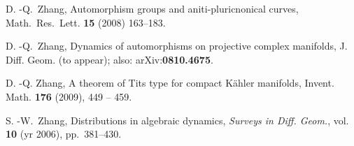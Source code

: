 \documentclass[11pt,a4paper,psamsfonts]{amsart}
\theoremstyle{plain}
\theoremstyle{definition}
\theoremstyle{remark}
\begin{document}
\begin{thebibliography}{99}
 D. -Q.~Zhang,
Automorphism groups and aniti-pluricnonical curves,
Math.\ Res.\ Lett. \textbf{15} (2008) 163--183.

 D. -Q.~Zhang,
Dynamics of automorphisms on projective complex manifolds,
J. Diff. Geom. (to appear);
also: arXiv:\textbf{0810.4675}.

 D. -Q. Zhang,
A theorem of Tits type for compact K\"ahler manifolds, Invent. Math.
\textbf{176} (2009), 449 -- 459.

 S. -W.~Zhang,
Distributions in algebraic dynamics,
\emph{Surveys in Diff. Geom.}, vol. \textbf{10} (yr 2006),
pp.~381--430.

\end{thebibliography}
\end{document}
